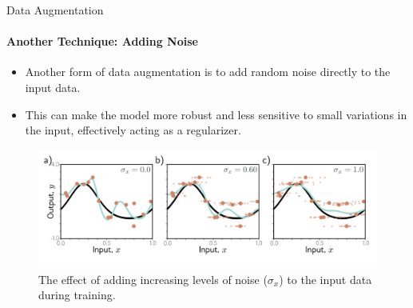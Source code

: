 \begin{frame}{Data Augmentation}
    \framesubtitle{Another Technique: Adding Noise}
    \begin{itemize}
        \item Another form of data augmentation is to add random noise directly to the input data.
        \item This can make the model more robust and less sensitive to small variations in the input, effectively acting as a regularizer.
    \end{itemize}
    \begin{figure}
        \centering
        \includegraphics[width=0.8\linewidth]{images/augmentation_noise.png}
        \caption{The effect of adding increasing levels of noise ($\sigma_x$) to the input data during training.}
    \end{figure}
\end{frame}